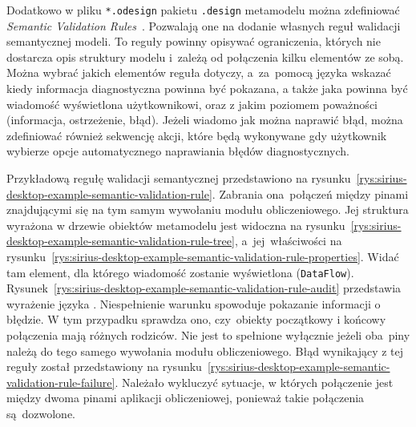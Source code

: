 Dodatkowo w pliku \texttt{*.odesign} pakietu \texttt{.design} metamodelu można
zdefiniować \emph{Semantic Validation
	Rules}~\cite{sirius-desktop-documentation-validation-rules}.
Pozwalają one na dodanie własnych reguł walidacji semantycznej modeli. To
reguły powinny opisywać ograniczenia, których nie dostarcza opis struktury
modelu i~zależą od połączenia kilku elementów ze sobą. Można
wybrać jakich elementów reguła dotyczy, a~za~pomocą języka \AQL{} wskazać
kiedy informacja diagnostyczna powinna być pokazana, a także jaka powinna być
wiadomość wyświetlona użytkownikowi, oraz z jakim poziomem poważności
(informacja, ostrzeżenie, błąd). Jeżeli wiadomo jak można naprawić błąd, można
zdefiniować również sekwencję akcji, które będą wykonywane gdy użytkownik
wybierze
opcje automatycznego naprawiania błędów diagnostycznych.

Przykładową regułę walidacji semantycznej przedstawiono na
rysunku~\ref{rys:sirius-desktop-example-semantic-validation-rule}.
Zabrania ona~połączeń między pinami znajdującymi się na tym samym wywołaniu
modułu obliczeniowego. Jej struktura wyrażona w drzewie obiektów metamodelu
jest widoczna na
rysunku~\ref{rys:sirius-desktop-example-semantic-validation-rule-tree},
a~jej~właściwości na
rysunku~\ref{rys:sirius-desktop-example-semantic-validation-rule-properties}.
Widać tam element, dla którego wiadomość zostanie wyświetlona
(\texttt{DataFlow}).
Rysunek~\ref{rys:sirius-desktop-example-semantic-validation-rule-audit}
przedstawia wyrażenie języka \AQL{}. Niespełnienie warunku spowoduje
pokazanie
informacji o błędzie. W tym przypadku sprawdza ono, czy~obiekty początkowy i
końcowy połączenia mają różnych rodziców. Nie jest to spełnione wyłącznie
jeżeli oba~piny należą do tego samego wywołania modułu obliczeniowego.
Błąd wynikający z tej reguły został
przedstawiony na
rysunku~\ref{rys:sirius-desktop-example-semantic-validation-rule-failure}.
Należało wykluczyć sytuacje, w
których połączenie jest między dwoma pinami aplikacji obliczeniowej, ponieważ
takie połączenia są~dozwolone.

